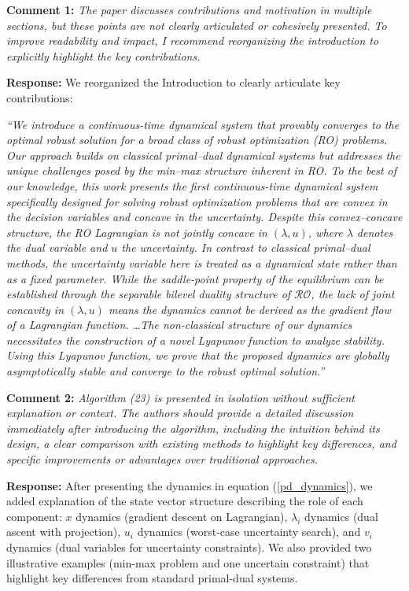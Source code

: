 \documentclass[journal,twoside,web]{ieeecolor}
\begin{document}
\vspace{0.5em}
\noindent\textbf{Comment 1:} \textit{The paper discusses contributions and motivation in multiple sections, but these points are not clearly articulated or cohesively presented. To improve readability and impact, I recommend reorganizing the introduction to explicitly highlight the key contributions.}

\noindent\textbf{Response:} We reorganized the Introduction to clearly articulate key contributions:

{\color{revisionblue}\textit{``We introduce a continuous-time dynamical system that provably converges to the optimal robust solution for a broad class of robust optimization (RO) problems. Our approach builds on classical primal--dual dynamical systems \cite{arrow1958,feijer2010} but addresses the unique challenges posed by the min--max structure inherent in RO. To the best of our knowledge, this work presents the first continuous-time dynamical system specifically designed for solving robust optimization problems that are convex in the decision variables and concave in the uncertainty. Despite this convex--concave structure, the RO Lagrangian is not jointly concave in $(\lambda,u)$, where $\lambda$ denotes the dual variable and $u$ the uncertainty. In contrast to classical primal--dual methods, the uncertainty variable here is treated as a dynamical state rather than as a fixed parameter. While the saddle-point property of the equilibrium can be established through the separable bilevel duality structure of $\mathcal{RO}$, the lack of joint concavity in $(\lambda,u)$ means the dynamics cannot be derived as the gradient flow of a Lagrangian function. \ldots The non-classical structure of our dynamics necessitates the construction of a novel Lyapunov function to analyze stability. Using this Lyapunov function, we prove that the proposed dynamics are globally asymptotically stable and converge to the robust optimal solution.''}}

\vspace{0.5em}
\noindent\textbf{Comment 2:} \textit{Algorithm (23) is presented in isolation without sufficient explanation or context. The authors should provide a detailed discussion immediately after introducing the algorithm, including the intuition behind its design, a clear comparison with existing methods to highlight key differences, and specific improvements or advantages over traditional approaches.}

\noindent\textbf{Response:} After presenting the dynamics in equation (\ref{pd_dynamics}), we added explanation of the state vector structure describing the role of each component: $x$ dynamics (gradient descent on Lagrangian), $\lambda_i$ dynamics (dual ascent with projection), $u_i$ dynamics (worst-case uncertainty search), and $v_i$ dynamics (dual variables for uncertainty constraints). We also provided two illustrative examples (min-max problem and one uncertain constraint) that highlight key differences from standard primal-dual systems.
\end{document}
